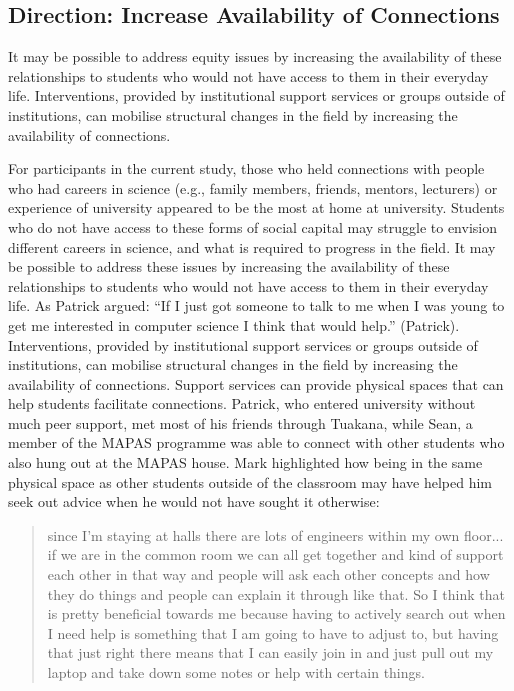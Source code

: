 \subsection{Direction: Increase Availability of Connections}
It may be possible to address equity issues by increasing the availability of these relationships to students who would not have access to them in their everyday life. Interventions, provided by institutional support services or groups outside of institutions, can mobilise structural changes in the field by increasing the availability of connections. 




For participants in the current study, those who held connections with people who had careers in science (e.g., family members, friends, mentors, lecturers) or experience of university appeared to be the most at home at university. Students who do not have access to these forms of social capital may struggle to envision different careers in science, and what is required to progress in the field. It may be possible to address these issues by increasing the availability of these relationships to students who would not have access to them in their everyday life. As Patrick argued: ``If I just got someone to talk to me when I was young to get me interested in computer science I think that would help.'' (Patrick). Interventions, provided by institutional support services or groups outside of institutions, can mobilise structural changes in the field by increasing the availability of connections. Support services can provide physical spaces that can help students facilitate connections. Patrick, who entered university without much peer support, met most of his friends through Tuakana, while Sean, a member of the MAPAS programme was able to connect with other students who also hung out at the MAPAS house. Mark highlighted how being in the same physical space as other students outside of the classroom may have helped him seek out advice when he would not have sought it otherwise: \blockquote{since I’m staying at halls there are lots of engineers within my own floor... if we are in the common room we can all get together and kind of support each other in that way and people will ask each other concepts and how they do things and people can explain it through like that. So I think that is pretty beneficial towards me because having to actively search out when I need help is something that I am going to have to adjust to, but having that just right there means that I can easily join in and just pull out my laptop and take down some notes or help with certain things.}

